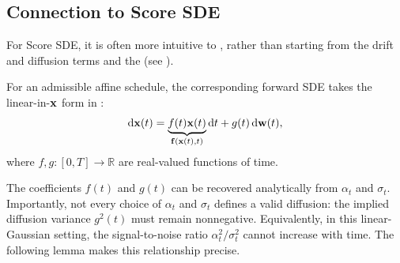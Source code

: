 \subsection{Connection to Score SDE}
For Score SDE, it is often more intuitive to , rather than starting from the drift and
diffusion terms and  the 
(see ).

For an admissible affine schedule, the corresponding forward SDE takes the
linear-in-${\mathbf{x}}$ form in :
\begin{align*}
    \mathop{}\!\mathrm{d} {\mathbf{x}}(t)
    =
    \underbrace{f(t){\mathbf{x}}(t)}_{{\mathbf{f}}({\mathbf{x}}(t),t)}
    \mathop{}\!\mathrm{d} t
    +
    g(t)\mathop{}\!\mathrm{d}{\mathbf{w}}(t),
\end{align*}
where $f,g\colon[0,T]\rightarrow\mathbb{R}$ are real-valued functions of time.

The coefficients $f(t)$ and $g(t)$ can be recovered analytically from
$\alpha_t$ and $\sigma_t$. Importantly, not every choice of
$\alpha_t$ and $\sigma_t$ defines a valid diffusion: the implied diffusion
variance $g^2(t)$ must remain nonnegative. Equivalently, in this
linear-Gaussian setting, the signal-to-noise ratio
$\alpha_t^2/\sigma_t^2$ cannot increase with time. The following lemma makes
this relationship precise.


